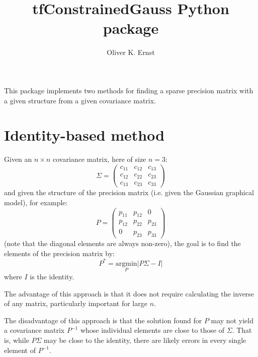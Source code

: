 \documentclass[11pt]{article}
\title{tfConstrainedGauss Python package}
\author{Oliver K. Ernst}
\begin{document}
\maketitle

This package implements two methods for finding a sparse precision matrix with a given structure from a given covariance matrix.


\section{Identity-based method}


Given an $n\times n$ covariance matrix, here of size $n=3$:
\begin{equation}
\Sigma = \begin{pmatrix}
	c_{11} & c_{12} & c_{13} \\
	c_{12} & c_{22} & c_{23} \\
	c_{13} & c_{23} & c_{33}
\end{pmatrix}
\end{equation}
and given the structure of the precision matrix (i.e. given the Gaussian graphical model), for example:
\begin{equation}
P = \begin{pmatrix}
	p_{11} & p_{12} & 0 \\
	p_{12} & p_{22} & p_{23} \\
	0 & p_{23} & p_{33}
\end{pmatrix}
\end{equation}
(note that the diagonal elements are always non-zero), the goal is to find the elements of the precision matrix by:
\begin{equation}
P^* = \underset{P}{\text{argmin}} |P \Sigma - I|
\end{equation}
where $I$ is the identity.

The advantage of this approach is that it does not require calculating the inverse of any matrix, particularly important for large $n$.

The disadvantage of this approach is that the solution found for $P$ may not yield a covariance matrix $P^{-1}$ whose individual elements are close to those of $\Sigma$. That is, while $P \Sigma$ may be close to the identity, there are likely errors in every single element of $P^{-1}$.
\end{document}
